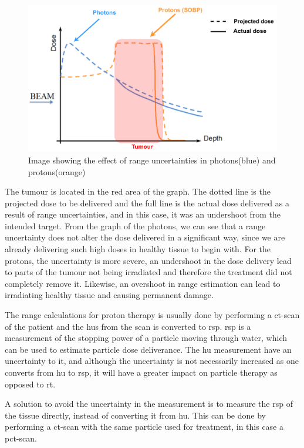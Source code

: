 \documentclass[main.tex]{subfiles}
\begin{document}
\begin{figure}[!htpb]
    \centering
    \includegraphics[width=12cm ]{images/projected_dose_graph.pdf}
    \caption{Image showing the effect of range uncertainties in photons(blue) and protons(orange)\cite{proton_challenges}}
    \label{fig: proton_uncertainty}
\end{figure}
\FloatBarrier

The tumour is located in the red area of the graph. The dotted line is the projected dose to be delivered and the full line is the actual dose delivered as a result of range uncertainties, and in this case, it was an undershoot from the intended target. From the graph of the photons, we can see that a range uncertainty does not alter the dose delivered in a significant way, since we are already delivering such high doses in healthy tissue to begin with. For the protons, the uncertainty is more severe, an undershoot in the dose delivery lead to parts of the tumour not being irradiated and therefore the treatment did not completely remove it. Likewise, an overshoot in range estimation can lead to irradiating healthy tissue and causing permanent damage.

The range calculations for proton therapy is usually done by performing a \gls{ct}-scan of the patient and the \acrlong{hu}s from the scan is converted to \acrlong{rsp}. \gls{rsp} is a measurement of the stopping power of a particle moving through water, which can be used to estimate particle dose deliverance. The \gls{hu} measurement have an uncertainty to it, and although the uncertainty is not necessarily increased as one converts from \gls{hu} to \gls{rsp}, it will have a greater impact on particle therapy as opposed to \gls{rt}\cite{proton_challenges}.

A solution to avoid the uncertainty in the measurement is to measure the \gls{rsp} of the tissue directly, instead of converting it from \gls{hu}. This can be done by performing a \gls{ct}-scan with the same particle used for treatment, in this case a \acrfull{pct}-scan. 
\end{document}
